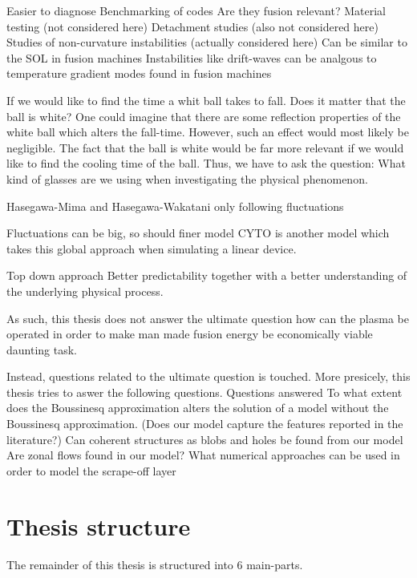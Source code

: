 Easier to diagnose
Benchmarking of codes
Are they fusion relevant?
Material testing (not considered here)
Detachment studies (also not considered here)
Studies of non-curvature instabilities (actually considered here)
Can be similar to the SOL in fusion machines
Instabilities like drift-waves can be analgous to temperature
gradient modes found in fusion machines

If we would like to find the time a whit ball takes to fall.
Does it matter that the ball is white?
One could imagine that there are some reflection properties of the white ball which alters the fall-time.
However, such an effect would most likely be negligible.
The fact that the ball is white would be far more relevant if we would like to find the cooling time of the ball.
Thus, we have to ask the question: What kind of glasses are we using when investigating the physical phenomenon.

Hasegawa-Mima and Hasegawa-Wakatani only following fluctuations

Fluctuations can be big, so should finer model
CYTO is another model which takes this global approach when simulating a linear device.










Top down approach
Better predictability together with a better understanding of the underlying physical process.

As such, this thesis does not answer the ultimate question
how can the plasma be operated in order to make man made fusion energy be economically viable
daunting task.

Instead, questions related to the ultimate question is touched.
More presicely, this thesis tries to aswer the following questions.
Questions answered
To what extent does the Boussinesq approximation alters the solution of a model without the Boussinesq approximation.
(Does our model capture the features reported in the literature?)
Can coherent structures as blobs and holes be found from our model
Are zonal flows found in our model?
What numerical approaches can be used in order to model the scrape-off layer


\section{Thesis structure}
%
The remainder of this thesis is structured into $6$ main-parts.

